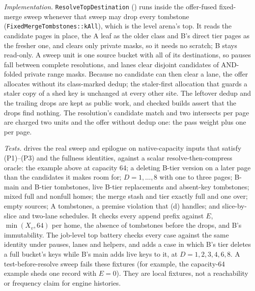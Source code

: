 \documentclass[11pt]{article}
\theoremstyle{definition}
\theoremstyle{remark}
\begin{document}
\emph{Implementation.} \texttt{ResolveTopDestination}
() runs inside the
offer-fused fixed-merge sweep whenever that sweep may drop every tombstone
(\texttt{FixedMergeTombstones::kAll}), which is the level arena's top. It reads the
candidate pages in place, the A leaf as the older class and B's direct tier
pages as the fresher one, and clears only private masks, so it needs no scratch;
B stays read-only. A sweep unit is one source bucket with all of its
destinations, so pauses fall between complete resolutions, and lanes clear
disjoint candidates of AND-folded private range masks. Because no candidate
can then clear a lane, the offer allocates without its class-marked dedup;
the staler-first allocation that guards a staler copy of a shed key is
unchanged at every other site. The leftover dedup and the trailing drops
are kept as public work, and checked builds assert that the drops find
nothing. The resolution's candidate match and two intersects per page are
charged two units and the offer without dedup one: the pass weight plus one
per page.

\emph{Tests.} 
drives the real sweep and epilogue on native-capacity inputs that satisfy
(P1)--(P3) and the fullness identities, against a scalar
resolve-then-compress oracle: the example above at capacity 64; a deleting
B-tier version on a later page than the candidates it makes room for;
$D=1,\ldots,8$ with one to three pages; B-main and B-tier tombstones, live
B-tier replacements and absent-key tombstones; mixed full and nonfull
homes; the merge stash and tier exactly full and one over; empty sources;
A tombstones, a premise violation that (d) handles; and slice-by-slice and
two-lane schedules. It checks every append prefix against $E$,
$\min(X_v,64)$ per home, the absence of tombstones before the drops, and
B's immutability. The job-level top battery checks every case against
the same identity under pauses, lanes and helpers, and adds a case in which
B's tier deletes a full bucket's keys while B's main adds live keys to it,
at $D=1,2,3,4,6,8$. A test-before-resolve sweep fails these fixtures (for
example, the capacity-64 example sheds one record with $E=0$). They are local
fixtures, not a reachability or frequency claim for engine histories.
\end{document}
